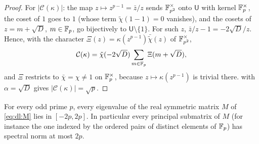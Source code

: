 \begin{proof}
For $|\mathcal C(\kappa)|$: the map $z\mapsto z^{p-1}=\bar z/z$ sends
$\mathbb F_{p^2}^\times$ onto $\mathsf U$ with kernel $\mathbb F_p^\times$, the coset of $1$
goes to $1$ (whose term $\tilde\chi(1-1)=0$ vanishes), and the cosets of
$z=m+\sqrt D$, $m\in\mathbb F_p$, go bijectively to $\mathsf U\setminus\{1\}$. For such
$z$, $\bar z/z-1=-2\sqrt D/z$. Hence, with the character
$\Xi(z)=\kappa(z^{p-1})\bar{\tilde\chi}(z)$ of $\mathbb F_{p^2}^\times$,
\[
  \mathcal C(\kappa)=\tilde\chi(-2\sqrt D)\sum_{m\in\mathbb F_p}\Xi(m+\sqrt D),
\]
and $\Xi$ restricts to $\bar\chi=\chi\ne1$ on $\mathbb F_p^\times$, because
$z\mapsto\kappa(z^{p-1})$ is trivial there.  with
$\alpha=\sqrt D$ gives $|\mathcal C(\kappa)|=\sqrt p$.
\end{proof}

\begin{theorem}\label{thm:dl:K}
For every odd prime $p$, every eigenvalue of the real symmetric matrix $M$ of
\eqref{eq:dl:M} lies in $[-2p,2p]$. In particular every principal submatrix of
$M$ (for instance the one indexed by the ordered pairs of distinct elements of
$\mathbb F_p$) has spectral norm at most $2p$.
\end{theorem}

